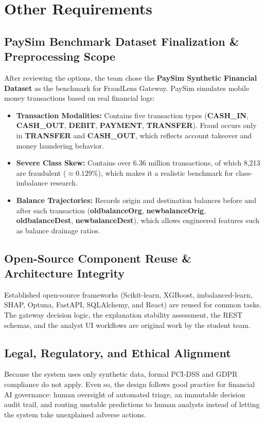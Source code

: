 \documentclass[12pt, a4paper]{report}
\begin{document}
\newpage

\chapter{Other Requirements}

\section{PaySim Benchmark Dataset Finalization \& Preprocessing Scope}
After reviewing the options, the team chose the \textbf{PaySim Synthetic Financial Dataset} as the benchmark for FraudLens Gateway. PaySim simulates mobile money transactions based on real financial logs:
\begin{itemize}
    \item \textbf{Transaction Modalities:} Contains five transaction types (\textbf{CASH\_IN}, \textbf{CASH\_OUT}, \textbf{DEBIT}, \textbf{PAYMENT}, \textbf{TRANSFER}). Fraud occurs only in \textbf{TRANSFER} and \textbf{CASH\_OUT}, which reflects account takeover and money laundering behavior.
    \item \textbf{Severe Class Skew:} Contains over 6.36 million transactions, of which 8,213 are fraudulent ($\approx 0.129\%$), which makes it a realistic benchmark for class-imbalance research.
    \item \textbf{Balance Trajectories:} Records origin and destination balances before and after each transaction (\textbf{oldbalanceOrg}, \textbf{newbalanceOrig}, \textbf{oldbalanceDest}, \textbf{newbalanceDest}), which allows engineered features such as balance drainage ratios.
\end{itemize}

\section{Open-Source Component Reuse \& Architecture Integrity}
Established open-source frameworks (Scikit-learn, XGBoost, imbalanced-learn, SHAP, Optuna, FastAPI, SQLAlchemy, and React) are reused for common tasks. The gateway decision logic, the explanation stability assessment, the REST schemas, and the analyst UI workflows are original work by the student team.

\section{Legal, Regulatory, and Ethical Alignment}
Because the system uses only synthetic data, formal PCI-DSS and GDPR compliance do not apply. Even so, the design follows good practice for financial AI governance: human oversight of automated triage, an immutable decision audit trail, and routing unstable predictions to human analysts instead of letting the system take unexplained adverse actions.
\end{document}

